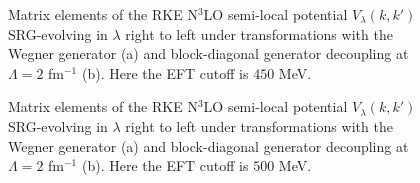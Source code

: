 \documentclass[preprintnumbers,floatfix,aps,prc,preprint,nofootinbib]{revtex4-1}
\begin{document}

\begin{figure}[H]
	\centering
	
	\caption{Matrix elements of the RKE N$^3$LO semi-local potential $V_{\lambda}(k, k')$ SRG-evolving in $\lambda$ right to left under transformations with the Wegner generator (a) and block-diagonal generator decoupling at $\Lambda=2$ fm$^{-1}$ (b). Here the EFT cutoff is $450$ MeV.}
	\label{potential_contours_kvnn106_3S1}
\end{figure}

\begin{figure}[H]
	\centering
	
	\caption{Matrix elements of the RKE N$^3$LO semi-local potential $V_{\lambda}(k, k')$ SRG-evolving in $\lambda$ right to left under transformations with the Wegner generator (a) and block-diagonal generator decoupling at $\Lambda=2$ fm$^{-1}$ (b). Here the EFT cutoff is $500$ MeV.}
	\label{potential_contours_kvnn111_3S1}
\end{figure}
\end{document}
